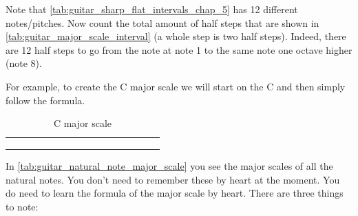 Note that \autoref{tab:guitar_sharp_flat_intervals_chap_5} has 12 different notes/pitches. Now count the total amount of half steps that are shown in \autoref{tab:guitar_major_scale_interval} (a whole step is two half steps). Indeed, there are 12 half steps to go from the note at note 1 to the same note one octave higher (note 8).

For example, to create the C major scale we will start on the C and then simply follow the formula.

\begin{table}[h]
	\centering
	\begin{NiceTabular}{*{16}{P{0.05mm}}}
		\Block{}{} &  & &  & &  & &  & &  & &  & &  & & \Block{}{} \\
		 & &  & &  & &  & &  & &  & &  & &  & \\
		 & &  & &  & &  & &  & &  & &  & &  & 
	\end{NiceTabular}
	\caption{C major scale}
	\label{tab:guitar_c_major_scale}
\end{table}

In \autoref{tab:guitar_natural_note_major_scale} you see the major scales of all the natural notes. You don't need to remember these by heart at the moment. You do need to learn the formula of the major scale by heart. There are three things to note:

